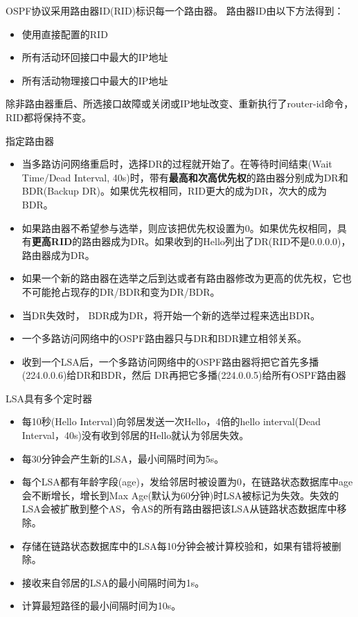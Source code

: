 OSPF协议采用路由器ID(RID)标识每一个路由器。
路由器ID由以下方法得到：
\begin{itemize}
	\item 使用直接配置的RID
	\item 所有活动环回接口中最大的IP地址
	\item 所有活动物理接口中最大的IP地址
\end{itemize}
除非路由器重启、所选接口故障或关闭或IP地址改变、重新执行了router-id命令，RID都将保持不变。


指定路由器
\begin{itemize}
	\item 当多路访问网络重启时，选择DR的过程就开始了。在等待时间结束(Wait Time/Dead Interval, 40s)时，带有\textbf{最高和次高优先权}的路由器分别成为DR和BDR(Backup DR)。如果优先权相同，RID更大的成为DR，次大的成为BDR。
	\item 如果路由器不希望参与选举，则应该把优先权设置为0。如果优先权相同，具有\textbf{更高RID}的路由器成为DR。如果收到的Hello列出了DR(RID不是0.0.0.0)，路由器成为DR。
	\item 如果一个新的路由器在选举之后到达或者有路由器修改为更高的优先权，它也不可能抢占现存的DR/BDR和变为DR/BDR。
	\item 当DR失效时， BDR成为DR，将开始一个新的选举过程来选出BDR。
	\item 一个多路访问网络中的OSPF路由器只与DR和BDR建立相邻关系。
	\item 收到一个LSA后，一个多路访问网络中的OSPF路由器将把它首先多播(224.0.0.6)给DR和BDR，然后 DR再把它多播(224.0.0.5)给所有OSPF路由器
\end{itemize}

LSA具有多个定时器
\begin{itemize}
	\item 每10秒(Hello Interval)向邻居发送一次Hello，4倍的hello interval(Dead Interval，40s)没有收到邻居的Hello就认为邻居失效。
	\item 每30分钟会产生新的LSA，最小间隔时间为5s。
	\item 每个LSA都有年龄字段(age)，发给邻居时被设置为0，在链路状态数据库中age会不断增长，增长到Max Age(默认为60分钟)时LSA被标记为失效。失效的LSA会被扩散到整个AS，令AS的所有路由器把该LSA从链路状态数据库中移除。
	\item 存储在链路状态数据库中的LSA每10分钟会被计算校验和，如果有错将被删除。
	\item 接收来自邻居的LSA的最小间隔时间为1s。
	\item 计算最短路径的最小间隔时间为10s。
\end{itemize}

